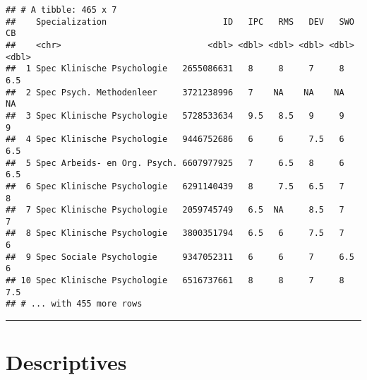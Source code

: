 \documentclass[
]{article}
\begin{document}
\begin{verbatim}
## # A tibble: 465 x 7
##    Specialization                       ID   IPC   RMS   DEV   SWO    CB
##    <chr>                             <dbl> <dbl> <dbl> <dbl> <dbl> <dbl>
##  1 Spec Klinische Psychologie   2655086631   8     8     7     8     6.5
##  2 Spec Psych. Methodenleer     3721238996   7    NA    NA    NA    NA  
##  3 Spec Klinische Psychologie   5728533634   9.5   8.5   9     9     9  
##  4 Spec Klinische Psychologie   9446752686   6     6     7.5   6     6.5
##  5 Spec Arbeids- en Org. Psych. 6607977925   7     6.5   8     6     6.5
##  6 Spec Klinische Psychologie   6291140439   8     7.5   6.5   7     8  
##  7 Spec Klinische Psychologie   2059745749   6.5  NA     8.5   7     7  
##  8 Spec Klinische Psychologie   3800351794   6.5   6     7.5   7     6  
##  9 Spec Sociale Psychologie     9347052311   6     6     7     6.5   6  
## 10 Spec Klinische Psychologie   6516737661   8     8     7     8     7.5
## # ... with 455 more rows
\end{verbatim}

\begin{center}\rule{0.5\linewidth}{0.5pt}\end{center}

\hypertarget{descriptives}{%
\section{Descriptives}\label{descriptives}}
\end{document}
